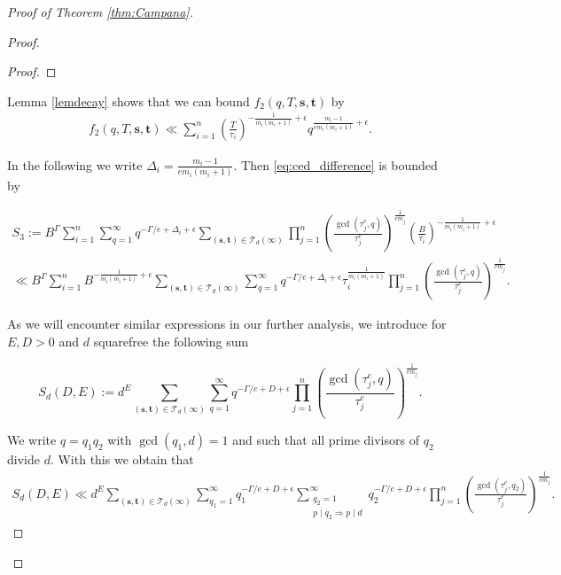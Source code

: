 \documentclass[10pt, a4paper, reqno, english]{amsart}
\newcommand\p{\mathfrak{p}} %
\theoremstyle{definition}
\numberwithin{theorem}{section}
\numberwithin{equation}{section}
\begin{document}
\begin{proof}[Proof of Theorem \ref{thm:Campana}]
\begin{proof}
\begin{proof}
\end{proof}

Lemma \ref{lemdecay} shows that we can bound $f_2(q,T,\mathbf{s},\mathbf{t})$ by
\begin{gather*}
f_2(q,T,\mathbf{s},\mathbf{t})\ll \sum_{i=1}^n \left(\frac{T}{\tau_i}\right)^{-\frac{1}{m_i(m_i+1)}+\epsilon} q^{\frac{m_i-1}{em_i(m_i+1)}+\epsilon}.
\end{gather*}

In the following we write $\Delta_i= \frac{m_i-1}{em_i(m_i+1)}$. Then \eqref{eq:ced_difference} is bounded by 

\begin{gather*}
S_3 := B^{\Gamma} \sum_{i=1}^n  \sum_{q=1}^\infty q^{-\Gamma/e+\Delta_i+\epsilon} \sum_{(\mathbf s,\mathbf t)\in \mathcal T_d(\infty)}\prod_{j=1}^n\left(\frac{\gcd(\tau_j^e,q)}{\tau_j^e}\right)^{\frac 1{em_j}}  \left(\frac{B}{\tau_i}\right)^{-\frac{1}{m_i(m_i+1)}+\epsilon}\\
\ll B^{\Gamma} \sum_{i=1}^n B^{-\frac{1}{m_i(m_i+1)}+\epsilon} \sum_{(\mathbf s,\mathbf t)\in \mathcal T_d(\infty)}\sum_{q=1}^\infty q^{-\Gamma/e+\Delta_i+\epsilon} \tau_i^{\frac{1}{m_i(m_i+1)}}\prod_{j=1}^n\left(\frac{\gcd(\tau_j^e,q)}{\tau_j^e}\right)^{\frac 1{em_j}}.  
\end{gather*} 

As we will encounter similar expressions in our further analysis, we introduce for $E,D>0$ and $d$ squarefree the following sum

$$S_d(D,E):=d^E \sum_{(\mathbf s,\mathbf t)\in \mathcal T_d(\infty)}\sum_{q=1}^\infty q^{-\Gamma/e+D+\epsilon} \prod_{j=1}^n\left(\frac{\gcd(\tau_j^e,q)}{\tau_j^e}\right)^{\frac 1{em_j}}. $$


We write $q=q_1q_2$ with $\gcd(q_1,d)=1$ and such that all prime divisors of $q_2$ divide $d$. With this we obtain that
\begin{gather*}
S_d(D,E)\ll d^E \sum_{(\mathbf s,\mathbf t)\in \mathcal T_d(\infty)} \sum_{q_1=1}^\infty q_1^{-\Gamma/e+D+\epsilon} \sum_{\substack{q_2=1\\p\mid q_2\Rightarrow p\mid d}}^\infty q_2^{-\Gamma/e+D+\epsilon}  \prod_{j=1}^n\left(\frac{\gcd(\tau_j^e,q_2)}{\tau_j^e}\right)^{\frac 1{em_j}}.  
\end{gather*}



\end{proof}
\end{proof}
\end{document}
